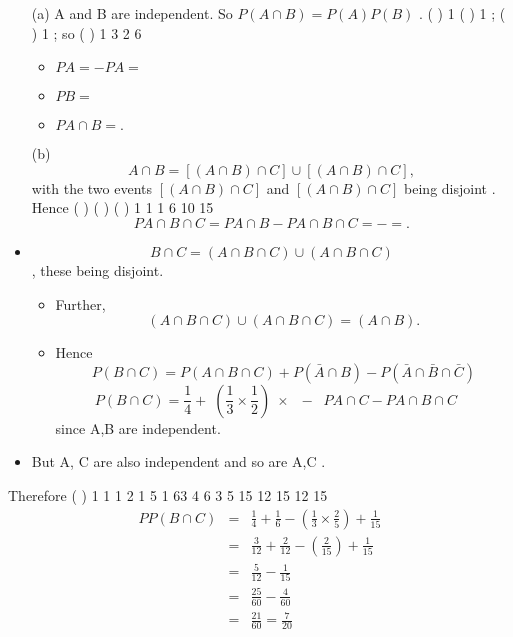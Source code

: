 \documentclass[a4paper,12pt]{article}
\begin{document}



\begin{itemize}
\item[(a)] A and B are independent. So $P(A\cap B) = P(A)P(B)$ .
( ) 1 ( ) 1 ; ( ) 1 ; so ( ) 1
3 2 6
\begin{itemize}
    \item $P A = − P A = $
    \item $P B = $
    \item $P A\cap B = .$
\end{itemize}
\end{itemize}


\begin{itemize}
\item[(b)] \[A\cap B = [(A\cap B)\cap C]\cup[(A\cap B)\cap C],\]
with the two events $[(A\cap B)\cap C]$ and $[(A\cap B)\cap C]$ being disjoint .
Hence ( ) ( ) ( ) 1 1 1
6 10 15
\[P A\cap B \cap C = P A\cap B − P A\cap B \cap C = − = .\]
\item  \[B\cap C = (A\cap B\cap C)\cup(A\cap B\cap C) \], these being disjoint.
\begin{itemize}
    \item Further, \[(A\cap B \cap C)\cup(A\cap B \cap C) = (A\cap B) .\]
\item Hence \[P(B \cap C) = P(A\cap B \cap C) + P(\bar{A} \cap B) − P(\bar{A} \cap \bar{B} \cap \bar{C})\]
\[P(B \cap C) =  \frac{1}{4}+ \left( \frac{1}{3} \times \frac{1}{2} \right) ×
 − P A\cap C − P A\cap B \cap C   \]
since A,B are independent.
\end{itemize}





\item But A, C are also independent and so are A,C .
\end{itemize}

Therefore ( ) 1 1 1 2 1 5 1 63
4 6 3 5 15 12 15 12 15
\begin{eqnarray*}
P P( B \cap C)  &=& \frac{1}{4} +\frac{1}{6} -\left( \frac{1}{3} \times \frac{2}{5} \right) + \frac{1}{15} \\
 &=& \frac{3}{12} +\frac{2}{12} -\left(  \frac{2}{15} \right) + \frac{1}{15}
 \\
 &=& \frac{5}{12} -\frac{1}{15}\\
 &=& \frac{25}{60} -\frac{4}{60}\\
  &=& \frac{21}{60} = \frac{7}{20}\\
\end{eqnarray*}
\end{document}
